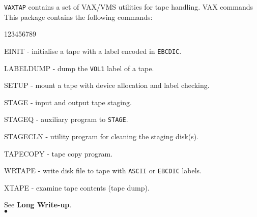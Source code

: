                     
                  
\Submitter{}                
{\tt VAXTAP} contains a set of VAX/VMS utilities for tape handling.
\Structure
VAX commands
\Usage
This package contains the following commands:
\begin{DLtt}{123456789}
\item[EINIT] - initialise a tape with a label encoded in {\tt EBCDIC}.
\item[LABELDUMP] - dump the {\tt VOL1} label of a tape.
\item[SETUP] - mount a tape with device allocation and label checking.
\item[STAGE] - input and output tape staging.
\item[STAGEQ] - auxiliary program to {\tt STAGE}.
\item[STAGECLN] - utility program for cleaning the staging disk(s).
\item[TAPECOPY] - tape copy program.
\item[WRTAPE] - write disk file to tape with {\tt ASCII} or
{\tt EBCDIC} labels.
\item[XTAPE] - examine tape contents (tape dump).
\item[]
\end{DLtt}
\Usage
See {\bf Long Write-up}.
\\ $\bullet$
